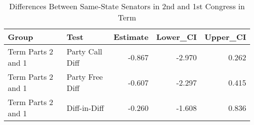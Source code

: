 \documentclass[12pt]{article}
\begin{document}
\begin{table}[H]
	\centering
	\caption{Differences Between Same-State Senators in  2nd and 1st Congress in Term} 
	\begin{tabular}{llrrr}
		\hline
		Group & Test & Estimate & Lower\_CI & Upper\_CI \\ 
		\hline
		Term Parts 2 and 1 & Party Call Diff & -0.867 & -2.970 & 0.262 \\ 
		Term Parts 2 and 1 & Party Free Diff & -0.607 & -2.297 & 0.415 \\ 
		Term Parts 2 and 1 & Diff-in-Diff & -0.260 & -1.608 & 0.836 \\ 
		\hline
	\end{tabular}
\end{table}
\end{document}
